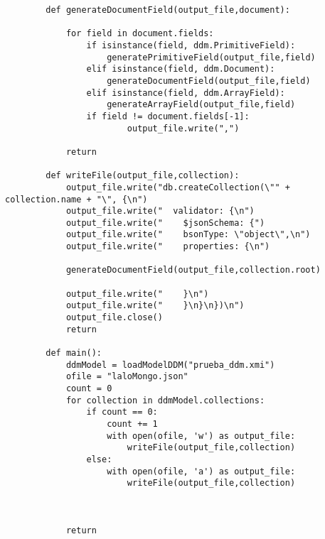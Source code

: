 \begin{code}
\begin{verbatim}
        def generateDocumentField(output_file,document):
        
            for field in document.fields:
                if isinstance(field, ddm.PrimitiveField):
                    generatePrimitiveField(output_file,field)
                elif isinstance(field, ddm.Document):
                    generateDocumentField(output_file,field)
                elif isinstance(field, ddm.ArrayField):
                    generateArrayField(output_file,field)
                if field != document.fields[-1]:
                        output_file.write(",")
        
            return
        
        def writeFile(output_file,collection):
            output_file.write("db.createCollection(\"" + collection.name + "\", {\n")
            output_file.write("  validator: {\n")
            output_file.write("    $jsonSchema: {")
            output_file.write("    bsonType: \"object\",\n")
            output_file.write("    properties: {\n")
            
            generateDocumentField(output_file,collection.root)
            
            output_file.write("    }\n")
            output_file.write("    }\n}\n})\n")
            output_file.close()
            return
        
        def main():
            ddmModel = loadModelDDM("prueba_ddm.xmi")
            ofile = "laloMongo.json"
            count = 0 
            for collection in ddmModel.collections:
                if count == 0:
                    count += 1
                    with open(ofile, 'w') as output_file:
                        writeFile(output_file,collection)
                else:
                    with open(ofile, 'a') as output_file:
                        writeFile(output_file,collection)
        
        
                        
            return
    \end{verbatim}
\end{code}